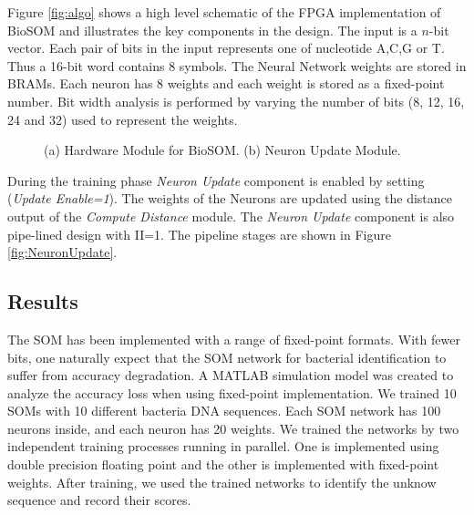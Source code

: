 \documentclass[a4paper,10pt]{article}
\begin{document}
Figure \ref{fig:algo} shows a high level schematic of the FPGA implementation of BioSOM and illustrates the key components in the design. The input is a $n$-bit vector. Each pair of bits in the input represents one of nucleotide A,C,G or T. Thus a 16-bit word contains 8 symbols.  The Neural Network weights are stored in BRAMs. Each neuron has 8 weights and each weight is stored as a fixed-point number. Bit width analysis is performed by varying the number of bits (8, 12, 16, 24 and 32) used to represent the weights.

\begin{figure}[!htb]
	\centering
	\hfil
	\caption{(a) Hardware Module for BioSOM. (b) Neuron Update Module.}	\label{fig:SOMFPGAImplementation}
	\vspace{-1.0em}	
\end{figure}

During the training phase \textit{Neuron Update} component is enabled by setting (\textit{Update Enable=1}). The weights of the Neurons are updated using the distance output of the \textit{Compute Distance} module. The \textit{Neuron Update} component is also pipe-lined design with II=1. The pipeline stages are shown in Figure \ref{fig:NeuronUpdate}.
\subsection{Results}
The SOM has been implemented with a range of fixed-point formats. With fewer bits, one naturally expect that the SOM network for bacterial identification to suffer from accuracy degradation. A MATLAB simulation model was created to analyze the accuracy loss when using fixed-point implementation. We trained 10 SOMs with 10 different bacteria DNA sequences. Each SOM network has 100 neurons inside, and each neuron has 20 weights. We trained the networks by two independent training processes running in parallel. One is implemented using double precision floating point and the other is implemented with fixed-point weights. After training, we used the trained networks to identify the unknow sequence and record their scores.
\end{document}
